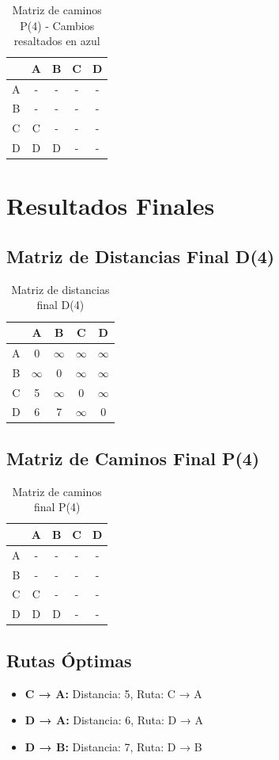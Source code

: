 \documentclass[12pt]{article}
\begin{document}
\begin{table}[h!]
\centering
\begin{tabular}{|c|c|c|c|c|}
\hline
 & A & B & C & D \\\hline
A & - & - & - & - \\\hline
B & - & - & - & - \\\hline
C & C & - & - & - \\\hline
D & D & D & - & - \\\hline
\end{tabular}
\caption{Matriz de caminos P(4) - Cambios resaltados en azul}
\end{table}

\clearpage
\section{Resultados Finales}
\subsection{Matriz de Distancias Final D(4)}
\begin{table}[h!]
\centering
\begin{tabular}{|c|c|c|c|c|}
\hline
 & A & B & C & D \\\hline
A & 0 & $\infty$ & $\infty$ & $\infty$ \\\hline
B & $\infty$ & 0 & $\infty$ & $\infty$ \\\hline
C & 5 & $\infty$ & 0 & $\infty$ \\\hline
D & 6 & 7 & $\infty$ & 0 \\\hline
\end{tabular}
\caption{Matriz de distancias final D(4)}
\end{table}

\clearpage
\subsection{Matriz de Caminos Final P(4)}
\begin{table}[h!]
\centering
\begin{tabular}{|c|c|c|c|c|}
\hline
 & A & B & C & D \\\hline
A & - & - & - & - \\\hline
B & - & - & - & - \\\hline
C & C & - & - & - \\\hline
D & D & D & - & - \\\hline
\end{tabular}
\caption{Matriz de caminos final P(4)}
\end{table}

\clearpage
\subsection{Rutas Óptimas}
\begin{itemize}
\item \textbf{C → A:} Distancia: 5, Ruta: C → A
\item \textbf{D → A:} Distancia: 6, Ruta: D → A
\item \textbf{D → B:} Distancia: 7, Ruta: D → B
\end{itemize}
\end{document}
